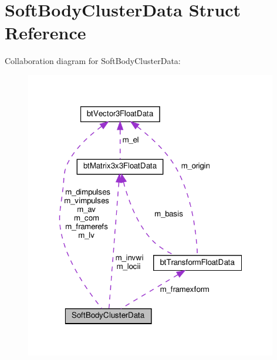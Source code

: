 \hypertarget{structSoftBodyClusterData}{}\section{Soft\+Body\+Cluster\+Data Struct Reference}
\label{structSoftBodyClusterData}


Collaboration diagram for Soft\+Body\+Cluster\+Data\+:
\nopagebreak
\begin{figure}[H]
\begin{center}
\leavevmode
\includegraphics[width=312pt]{structSoftBodyClusterData__coll__graph}
\end{center}
\end{figure}
